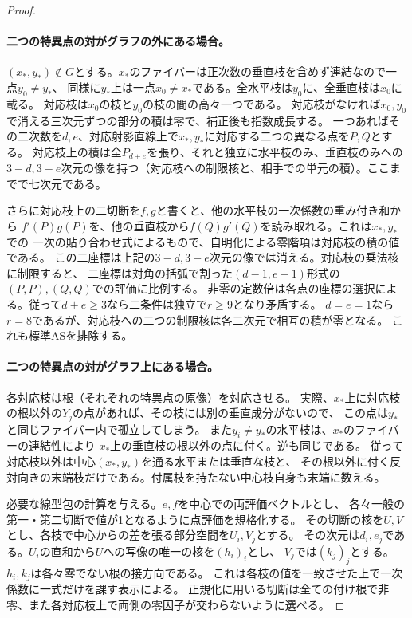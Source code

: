\begin{proof}
\paragraph{二つの特異点の対がグラフの外にある場合。}
$(x_*,y_*)\notin G$とする。$x_*$のファイバーは正次数の垂直枝を含めず連結なので一点$y_0\ne y_*$、
同様に$y_*$上は一点$x_0\ne x_*$である。全水平枝は$y_0$に、全垂直枝は$x_0$に載る。
対応枝は$x_0$の枝と$y_0$の枝の間の高々一つである。
対応枝がなければ$x_0,y_0$で消える三次元ずつの部分の積は零で、補正後も指数成長する。
一つあればその二次数を$d,e$、対応射影直線上で$x_*,y_*$に対応する二つの異なる点を$P,Q$とする。
対応枝上の積は全$P_{d+e}$を張り、それと独立に水平枝のみ、垂直枝のみへの
$3-d,3-e$次元の像を持つ（対応枝への制限核と、相手での単元の積）。ここまでで七次元である。

さらに対応枝上の二切断を$f,g$と書くと、他の水平枝の一次係数の重み付き和から
$f'(P)g(P)$を、他の垂直枝から$f(Q)g'(Q)$を読み取れる。これは$x_*,y_*$での
一次の貼り合わせ式によるもので、自明化による零階項は対応枝の積の値である。
この二座標は上記の$3-d,3-e$次元の像では消える。対応枝の乗法核に制限すると、
二座標は対角の括弧で割った$(d-1,e-1)$形式の$(P,P),(Q,Q)$での評価に比例する。
非零の定数倍は各点の座標の選択による。従って$d+e\ge3$なら二条件は独立で$r\ge9$となり矛盾する。
$d=e=1$なら$r=8$であるが、対応枝への二つの制限核は各二次元で相互の積が零となる。
これも標準ASを排除する。

\paragraph{二つの特異点の対がグラフ上にある場合。}
各対応枝は根（それぞれの特異点の原像）を対応させる。
実際、$x_*$上に対応枝の根以外の$Y_j$の点があれば、その枝には別の垂直成分がないので、
この点は$y_*$と同じファイバー内で孤立してしまう。
また$y_i\ne y_*$の水平枝は、$x_*$のファイバーの連結性により
$x_*$上の垂直枝の根以外の点に付く。逆も同じである。
従って対応枝以外は中心$(x_*,y_*)$を通る水平または垂直な枝と、
その根以外に付く反対向きの末端枝だけである。付属枝を持たない中心枝自身も末端に数える。

必要な線型包の計算を与える。$e,f$を中心での両評価ベクトルとし、
各々一般の第一・第二切断で値が1となるように点評価を規格化する。
その切断の核を$U,V$とし、各枝で中心からの差を張る部分空間を$U_i,V_j$とする。
その次元は$d_i,e_j$である。$U_i$の直和から$U$への写像の唯一の核を$(h_i)_i$とし、
$V_j$では$(k_j)_j$とする。$h_i,k_j$は各々零でない根の接方向である。
これは各枝の値を一致させた上で一次係数に一式だけを課す表示による。
正規化に用いる切断は全ての付け根で非零、また各対応枝上で両側の零因子が交わらないように選べる。


\end{proof}
